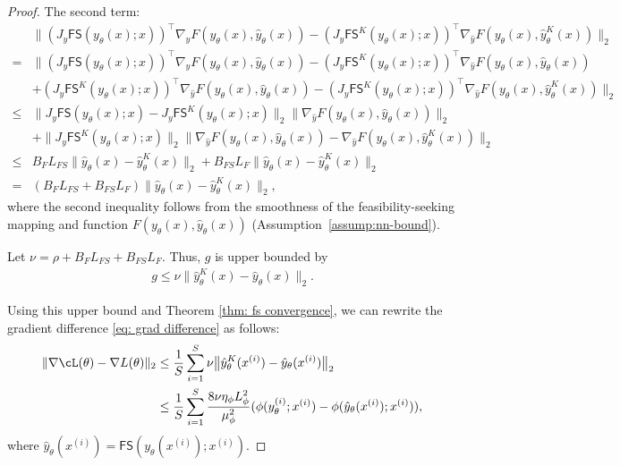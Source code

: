 \documentclass{article}
\def\FS{\mathsf{FS}}
\def\x{x}
\def\y{y_{\theta}}   \def\hy{\hat{y}_{\theta}}    \def\ty{\Tilde{y}}
\def\i{{(i)}}
\begin{document}
\begin{proof}
The second term:
\begin{align*}
    &\big\| (J_y \FS(\y(\x); \x))^\top \nabla_{\hat{y}} F(\y(\x), \hy(\x)) -  (J_y \FS^K(\y(\x);\x))^\top \nabla_{\hat{y}} F(\y(\x), \hy^K(\x))\big\|_2 \\
    =&\big\| (J_y \FS(\y(\x); \x))^\top \nabla_{\hat{y}} F(\y(\x), \hy(\x)) - (J_y \FS^K(\y(\x);\x))^\top \nabla_{\hat{y}}  F(\y(\x), \hy(\x)) \\
    &+ (J_y \FS^K(\y(\x);\x))^\top \nabla_{\hat{y}}  F(\y(\x), \hy(\x)) -  (J_y \FS^K(\y(\x);\x))^\top \nabla_{\hat{y}} F(\y(\x), \hy^K(\x))\big\|_2
    \\
    \leq & \big\| J_y \FS(\y(\x); \x) - J_y \FS^K(\y(\x);\x)\big\|_2 \big\|\nabla_{\hat{y}} F(\y(\x), \hy(\x))\big\|_2 \\
    &+ \big\| J_y \FS^K(\y(\x);\x)\big\|_2 \big\|\nabla_{\hat{y}}  F(\y(\x), \hy(\x)) -  \nabla_{\hat{y}} F(\y(\x), \hy^K(\x))\big\|_2  \\
    \leq & B_F L_{FS} \big\| \hy(\x) - \hy^K(\x) \big\|_2 +  B_{FS} L_F \big\| \hy(\x) - \hy^K(\x) \big\|_2 \\
    =& (B_F L_{FS} +  B_{FS} L_F) \big\| \hy(\x) - \hy^K(\x) \big\|_2,
\end{align*}
where the second inequality follows from the smoothness of the feasibility-seeking mapping and function $F(\y(\x),\hy(\x))$ (Assumption~\ref{assump:nn-bound}).

Let $\nu = \rho + B_F L_{FS} +  B_{FS} L_F$. Thus, $g$ is upper bounded by
\begin{align*}
    g \leq \nu \| \hy^K(\x) - \hy(\x)\|_2.
\end{align*}

Using this upper bound and Theorem \ref{thm: fs convergence}, we can rewrite the gradient difference \eqref{eq: grad difference} as follows: 
\begin{align}
    \|\nabla \cL(\theta) -  \nabla L(\theta) \|_2   &\leq \frac{1}{S}\sum_{i=1}^S \nu \big\| \hy^K(\x^\i) - \hy(\x^\i) \big\|_2 \nonumber\\
    &\leq \frac{1}{S}\sum_{i=1}^S \frac{8 \nu \eta_\phi L_\phi^2}{\mu_\phi^2} (\phi(\y^\i; \x^\i) - \phi(\hy(\x^\i); \x^\i)), \label{eq: thm1-bound1}
\end{align}
where $\hy(\x^\i) = \FS(\y(\x^\i); \x^\i)$.


\end{proof}
\end{document}
